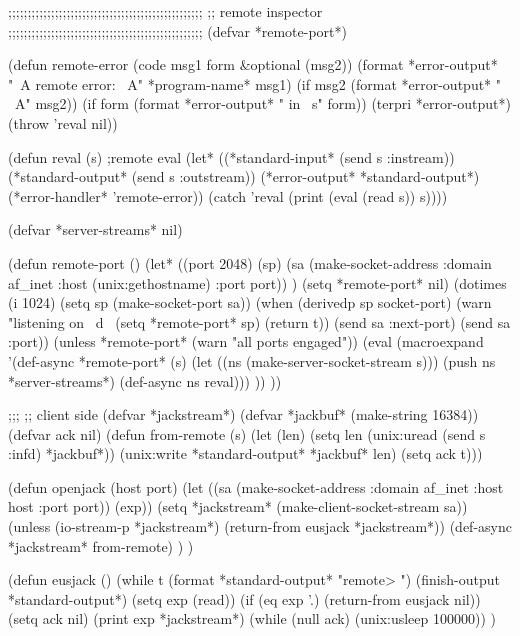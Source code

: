 ;;;;;;;;;;;;;;;;;;;;;;;;;;;;;;;;;;;;;;;;;;;;;;;;;;
;; remote inspector
;;;;;;;;;;;;;;;;;;;;;;;;;;;;;;;;;;;;;;;;;;;;;;;;;;
(defvar *remote-port*)

(defun remote-error (code msg1 form &optional (msg2))
      (format *error-output* "~A remote error: ~A" *program-name* msg1)
      (if msg2 (format *error-output* " ~A" msg2))
      (if form (format *error-output* " in ~s" form))
      (terpri *error-output*)
      (throw 'reval nil))

(defun reval (s)	;remote eval
      (let* ((*standard-input* (send s :instream))
	     (*standard-output* (send s :outstream))
	     (*error-output* *standard-output*)
	     (*error-handler* 'remote-error))
        (catch 'reval
	   (print (eval (read s)) s))))

(defvar *server-streams* nil)

(defun remote-port ()
  (let* ((port 2048) (sp)
	 (sa (make-socket-address
			:domain af_inet 
			:host (unix:gethostname)
			:port port)) )
    (setq *remote-port* nil)
    (dotimes (i 1024)
	(setq sp (make-socket-port sa))
	(when (derivedp sp socket-port)
	   (warn "listening on ~d~%
	   (setq *remote-port* sp)
	   (return t))
	(send sa :next-port)
	(send sa :port))
    (unless *remote-port*  (warn "all ports engaged"))
    (eval (macroexpand '(def-async *remote-port* (s)
	 (let ((ns (make-server-socket-stream s)))
	     (push ns *server-streams*)
	     (def-async ns reval))) ))
))

;;;
;; client side
(defvar *jackstream*)
(defvar *jackbuf* (make-string 16384))
(defvar ack nil)
(defun from-remote (s)
   (let (len)
      (setq len (unix:uread (send s :infd) *jackbuf*))
      (unix:write *standard-output* *jackbuf* len)
      (setq ack t)))

(defun openjack (host port)
  (let ((sa (make-socket-address :domain af_inet :host host :port port))
	(exp))
    (setq *jackstream* (make-client-socket-stream sa))
    (unless (io-stream-p *jackstream*) (return-from eusjack *jackstream*))
    (def-async *jackstream*  from-remote)
    ) )

(defun eusjack ()
    (while t
	(format *standard-output* "remote> ")
	(finish-output *standard-output*)
	(setq exp (read))
	(if (eq exp '.) (return-from eusjack nil))
	(setq ack nil)
	(print exp *jackstream*)
	(while (null ack) (unix:usleep 100000))
    )


